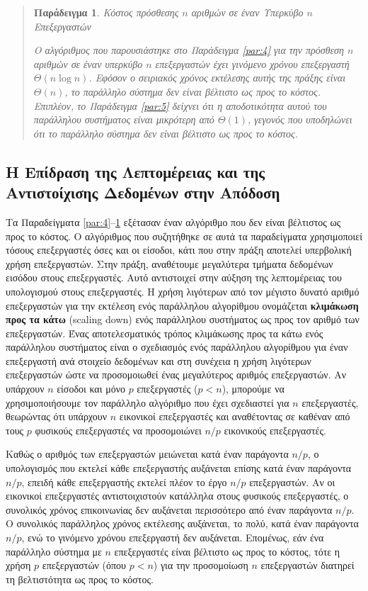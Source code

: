 \documentclass[12pt,a4paper]{article} %
\newtheorem{paradeigma}{Παράδειγμα}
\begin{document}
\begin{quote}
\begin{paradeigma} \label{par:6} Κόστος πρόσθεσης $n$ αριθμών σε έναν Υπερκύβο $n$ Επεξεργαστών

Ο αλγόριθμος που παρουσιάστηκε στο Παράδειγμα \ref{par:4} για την πρόσθεση 
$n$ αριθμών σε έναν υπερκύβο $n$ επεξεργαστών έχει γινόμενο χρόνου 
επεξεργαστή $\Theta(n \log n)$. Εφόσον ο σειριακός χρόνος εκτέλεσης αυτής 
της πράξης είναι $\Theta(n)$, το παράλληλο σύστημα δεν είναι βέλτιστο ως 
προς το κόστος. Επιπλέον, το Παράδειγμα \ref{par:5} δείχνει ότι η 
αποδοτικότητα αυτού του παράλληλου συστήματος είναι μικρότερη από $\Theta(1)$, 
γεγονός που υποδηλώνει ότι το παράλληλο σύστημα δεν είναι βέλτιστο ως 
προς το κόστος.
\end{paradeigma}
\end{quote}

\subsection{Η Επίδραση της Λεπτομέρειας και της Αντιστοίχισης Δεδομένων στην Απόδοση}

Τα Παραδείγματα \ref{par:4}--\ref{par:6} εξέτασαν έναν αλγόριθμο που δεν 
είναι βέλτιστος ως προς το κόστος. Ο αλγόριθμος που συζητήθηκε σε αυτά τα 
παραδείγματα χρησιμοποιεί τόσους επεξεργαστές όσες και οι είσοδοι, κάτι 
που στην πράξη αποτελεί υπερβολική χρήση επεξεργαστών. Στην πράξη, αναθέτουμε 
μεγαλύτερα τμήματα δεδομένων εισόδου στους επεξεργαστές. Αυτό αντιστοιχεί 
στην αύξηση της λεπτομέρειας του υπολογισμού στους επεξεργαστές. Η χρήση 
λιγότερων από τον μέγιστο δυνατό αριθμό επεξεργαστών για την εκτέλεση ενός 
παράλληλου αλγορίθμου ονομάζεται \textbf{κλιμάκωση προς τα κάτω} 
(scaling down) ενός παράλληλου συστήματος ως 
προς τον αριθμό των επεξεργαστών. Ένας αποτελεσματικός τρόπος κλιμάκωσης 
προς τα κάτω ενός παράλληλου συστήματος είναι ο σχεδιασμός ενός παράλληλου 
αλγορίθμου για έναν επεξεργαστή ανά στοιχείο δεδομένων και στη συνέχεια η 
χρήση λιγότερων επεξεργαστών ώστε να προσομοιωθεί ένας μεγαλύτερος αριθμός 
επεξεργαστών. Αν υπάρχουν $n$ είσοδοι και μόνο $p$ επεξεργαστές ($p < n$), 
μπορούμε να χρησιμοποιήσουμε τον παράλληλο αλγόριθμο που έχει σχεδιαστεί 
για $n$ επεξεργαστές, θεωρώντας ότι υπάρχουν $n$ εικονικοί επεξεργαστές 
και αναθέτοντας σε καθέναν από τους $p$ φυσικούς επεξεργαστές να 
προσομοιώνει $n/p$ εικονικούς επεξεργαστές.

Καθώς ο αριθμός των επεξεργαστών μειώνεται κατά έναν παράγοντα $n/p$, ο 
υπολογισμός που εκτελεί κάθε επεξεργαστής αυξάνεται επίσης κατά έναν 
παράγοντα $n/p$, επειδή κάθε επεξεργαστής εκτελεί πλέον το έργο $n/p$ 
επεξεργαστών. Αν οι εικονικοί επεξεργαστές αντιστοιχιστούν κατάλληλα στους 
φυσικούς επεξεργαστές, ο συνολικός χρόνος επικοινωνίας δεν αυξάνεται 
περισσότερο από έναν παράγοντα $n/p$. Ο συνολικός παράλληλος χρόνος 
εκτέλεσης αυξάνεται, το πολύ, κατά έναν παράγοντα $n/p$, ενώ το γινόμενο 
χρόνου επεξεργαστή δεν αυξάνεται. Επομένως, εάν ένα παράλληλο σύστημα με 
$n$ επεξεργαστές είναι βέλτιστο ως προς το κόστος, τότε η χρήση $p$ 
επεξεργαστών (όπου $p < n$) για την προσομοίωση $n$ επεξεργαστών διατηρεί 
τη βελτιστότητα ως προς το κόστος.
\end{document}
